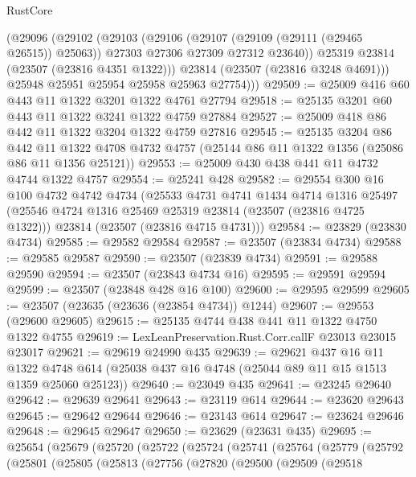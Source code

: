 \begin{lexlean}{RustCore}
\begin{coremodule}
          (@29096
            (@29102
              (@29103
                (@29106
                  (@29107 (@29109 (@29111 (@29465 @26515)) @25063))
                  @27303
                  @27306
                  @27309
                  @27312
                  @23640))
              @25319
              @23814
              (@23507 (@23816 @4351 @1322)))
            @23814
            (@23507 (@23816 @3248 @4691)))
          @25948
          @25951
          @25954
          @25958
          @25963
          @27754)))
@29509 := @25009 @416 @60 @443 @11 @1322 @3201 @1322 @4761 @27794
@29518 := @25135 @3201 @60 @443 @11 @1322 @3241 @1322 @4759 @27884
@29527 := @25009 @418 @86 @442 @11 @1322 @3204 @1322 @4759 @27816
@29545 := @25135
    @3204
    @86
    @442
    @11
    @1322
    @4708
    @4732
    @4757
    (@25144 @86 @11 @1322 @1356 (@25086 @86 @11 @1356 @25121))
@29553 := @25009 @430 @438 @441 @11 @4732 @4744 @1322 @4757
@29554 := @25241 @428
@29582 := @29554
    @300
    @16
    @100
    @4732
    @4742
    @4734
    (@25533
      @4731
      @4741
      @1434
      @4714
      @1316
      @25497
      (@25546 @4724 @1316 @25469 @25319 @23814 (@23507 (@23816 @4725 @1322)))
      @23814
      (@23507 (@23816 @4715 @4731)))
@29584 := @23829 (@23830 @4734)
@29585 := @29582 @29584
@29587 := @23507 (@23834 @4734)
@29588 := @29585 @29587
@29590 := @23507 (@23839 @4734)
@29591 := @29588 @29590
@29594 := @23507 (@23843 @4734 @16)
@29595 := @29591 @29594
@29599 := @23507 (@23848 @428 @16 @100)
@29600 := @29595 @29599
@29605 := @23507 (@23635 (@23636 (@23854 @4734)) @1244)
@29607 := @29553 (@29600 @29605)
@29615 := @25135 @4744 @438 @441 @11 @1322 @4750 @1322 @4755
@29619 := LexLeanPreservation.Rust.Corr.callF @23013 @23015 @23017
@29621 := @29619 @24990 @435
@29639 := @29621
    @437
    @16
    @11
    @1322
    @4748
    @614
    (@25038 @437 @16 @4748 (@25044 @89 @11 @15 @1513 @1359 @25060 @25123))
@29640 := @23049 @435
@29641 := @23245 @29640
@29642 := @29639 @29641
@29643 := @23119 @614
@29644 := @23620 @29643
@29645 := @29642 @29644
@29646 := @23143 @614
@29647 := @23624 @29646
@29648 := @29645 @29647
@29650 := @23629 (@23631 @435)
@29695 := @25654
    (@25679
      (@25720
        (@25722
          (@25724
            (@25741
              (@25764
                (@25779
                  (@25792
                    (@25801
                      (@25805
                        (@25813
                          (@27756
                            (@27820
                              (@29500
                                (@29509
                                  (@29518

\end{coremodule}
\end{lexlean}
